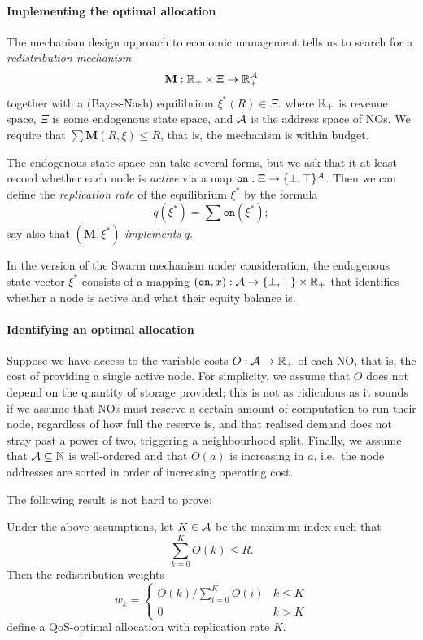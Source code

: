 \paragraph{Implementing the optimal allocation}
The mechanism design approach to economic management tells us to search for a \emph{redistribution mechanism} 
\[
  \mathbf{M}:\mathbb{R}_+ \times \Xi \rightarrow \mathbb{R}_+^{\mathcal{A}}
\]
together with a (Bayes-Nash) equilibrium $\xi^*(R)\in\Xi$.
%
where $\mathbb{R}_+$ is revenue space, $\Xi$ is some endogenous state space, and $\mathcal{A}$ is the address space of NOs.
%
We require that $\sum\mathbf{M}(R,\xi)\leq R$, that is, the mechanism is within budget.

The endogenous state space can take several forms, but we ask that it at least record whether each node is \emph{active} via a map $\mathtt{on}:\Xi\rightarrow \{\bot,\top\}^{\mathcal{A}}$.
%
Then we can define the \emph{replication rate} of the equilibrium $\xi^*$ by the formula
\[
  q(\xi^*) = \sum\mathtt{on}(\xi^*);
\]
say also that $(\mathbf{M},\xi^*)$ \emph{implements} $q$.

\begin{example*}In the version of the Swarm mechanism under consideration, the endogenous state vector $\xi^*$ consists of a mapping $(\mathtt{on},x):\mathcal{A}\rightarrow \{\bot,\top\}\times\mathbb{R}_+$ that identifies whether a node is active and what their equity balance is.
\end{example*}

\paragraph{Identifying an optimal allocation}
Suppose we have access to the variable costs $O:\mathcal{A}\rightarrow\mathbb{R}_+$ of each NO, that is, the cost of providing a single active node.
%
For simplicity, we assume that $O$ does not depend on the quantity of storage provided; this is not as ridiculous as it sounds if we assume that NOs must reserve a certain amount of computation to run their node, regardless of how full the reserve is, and that realised demand does not stray past a power of two, triggering a neighbourhood split.
%
Finally, we assume that $\mathcal{A}\subseteq\mathbb{N}$ is well-ordered and that $O(a)$ is increasing in $a$, i.e.~the node addresses are sorted in order of increasing operating cost.

The following result is not hard to prove:
%
\begin{proposition*}
  Under the above assumptions, let $K\in\mathcal{A}$ be the maximum index such that
  \[
    \sum_{k=0}^KO(k) \leq R.
  \]
  Then the redistribution weights
  \[
    w_k = \left\{ \begin{array}{ll}
      O(k)/\sum_{i=0}^KO(i) & k\leq K \\
      0 & k > K
    \end{array} \right.
  \]
  define a QoS-optimal allocation with replication rate $K$.
\end{proposition*}


